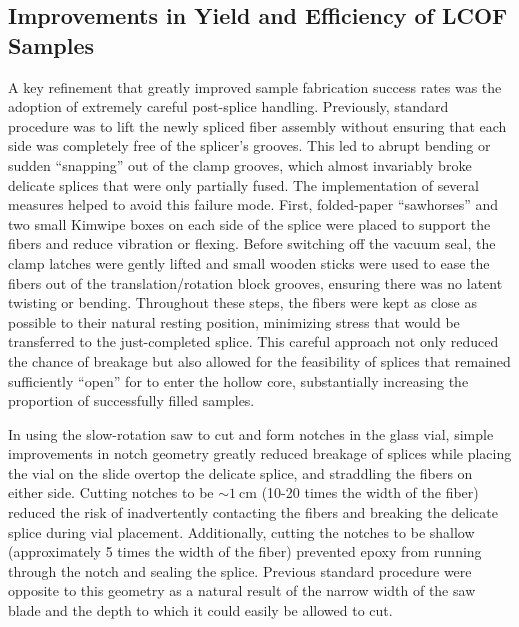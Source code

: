 \subsection{Improvements in Yield and Efficiency of \acs{LCOF} Samples}

A key refinement that greatly improved sample fabrication success rates was the adoption of extremely careful post-splice handling. Previously, standard procedure was to lift the newly spliced fiber assembly without ensuring that each side was completely free of the splicer’s grooves. This led to abrupt bending or sudden “snapping” out of the clamp grooves, which almost invariably broke delicate splices that were only partially fused. The implementation of several measures helped to avoid this failure mode. First, folded-paper “sawhorses” and two small Kimwipe boxes on each side of the splice were placed to support the fibers and reduce vibration or flexing. Before switching off the vacuum seal, the clamp latches were gently lifted and small wooden sticks were used to ease the fibers out of the translation/rotation block grooves, ensuring there was no latent twisting or bending. Throughout these steps, the fibers were kept as close as possible to their natural resting position, minimizing stress that would be transferred to the just-completed splice. This careful approach not only reduced the chance of breakage but also allowed for the feasibility of splices that remained sufficiently “open” for  to enter the hollow core, substantially increasing the proportion of successfully filled samples.

In using the slow-rotation saw to cut and form notches in the glass vial, simple improvements in notch geometry greatly reduced breakage of splices while placing the vial on the slide overtop the delicate splice, and straddling the fibers on either side. Cutting notches to be \(\sim\SI{1}{\centi\meter}\) (10-20 times the width of the fiber) reduced the risk of inadvertently contacting the fibers and breaking the delicate splice during vial placement. Additionally, cutting the notches to be shallow (approximately 5 times the width of the fiber) prevented epoxy from running through the notch and sealing the splice. Previous standard procedure were opposite to this geometry as a natural result of the narrow width of the saw blade and the depth to which it could easily be allowed to cut.

